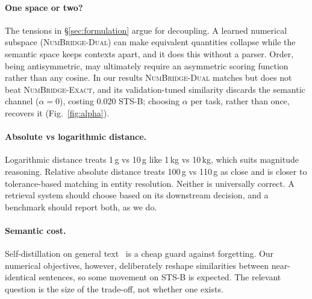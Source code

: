 \documentclass[11pt]{article}
\newcommand{\vExact}{\textup{\textsc{NumBridge-Exact}}\xspace}           %
\newcommand{\vDual}{\textup{\textsc{NumBridge-Dual}}\xspace}             %
\begin{document}
\paragraph{One space or two?} The tensions in \S\ref{sec:formulation} argue for decoupling. A learned numerical
subspace (\vDual) can make equivalent quantities collapse while the semantic space keeps contexts apart, and it does
this without a parser. Order, being antisymmetric, may ultimately require an asymmetric scoring
function~\cite{vendrov2016order} rather than any cosine. In our results \vDual matches but does not beat \vExact, and its validation-tuned similarity discards the semantic
channel ($\alpha=0$), costing 0.020 STS-B; choosing $\alpha$ per task, rather than once, recovers it (Fig.~\ref{fig:alpha}).

\paragraph{Absolute vs logarithmic distance.} Logarithmic distance treats 1\,g vs 10\,g like 1\,kg vs 10\,kg, which suits
magnitude reasoning. Relative absolute distance treats 100\,g vs 110\,g as close and is closer to tolerance-based matching
in entity resolution. Neither is universally correct. A retrieval system should choose based on its downstream
decision, and a benchmark should report both, as we do.

\paragraph{Semantic cost.} Self-distillation on general text~\cite{reimers2020multilingual} is a cheap guard against
forgetting. Our numerical objectives, however, deliberately reshape similarities between near-identical sentences, so
some movement on STS-B is expected. The relevant question is the size of the trade-off, not whether one exists.

\end{document}
